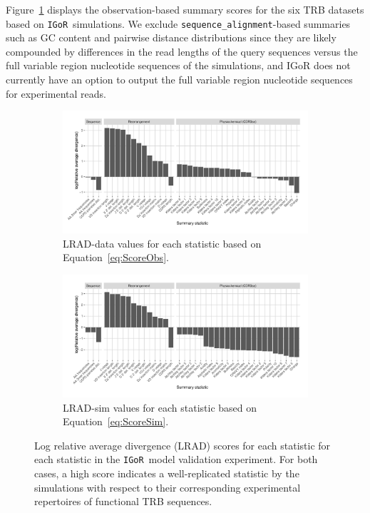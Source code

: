 \documentclass{article}
\newcommand{\igor}{\texttt{IGoR}}
\begin{document}
Figure~\ref{fig:ObsScoresTCR} displays the observation-based summary scores for the six TRB datasets based on \igor\ simulations.
We exclude \texttt{sequence\_alignment}-based summaries such as GC content and pairwise distance distributions since they are likely compounded by differences in the read lengths of the query sequences versus the full variable region nucleotide sequences of the simulations, and IGoR does not currently have an option to output the full variable region nucleotide sequences for experimental reads.
\begin{figure}
	\begin{subfigure}{\textwidth}
    	\includegraphics[width=\linewidth]{Figures/IgorScores/obs_score_plot.pdf}
    	\caption{LRAD-data values for each statistic based on Equation~\ref{eq:ScoreObs}.
        }
    	\label{fig:ObsScoresTCR}
	\end{subfigure}
	\begin{subfigure}{\textwidth}
    	\includegraphics[width=\linewidth]{Figures/IgorScores/sim_score_plot.pdf}
    	\caption{LRAD-sim values for each statistic based on Equation~\ref{eq:ScoreSim}.
    	}
    	\label{fig:SimScoresTCR}
	\end{subfigure}
	\caption{Log relative average divergence (LRAD) scores for each statistic for each statistic in the \igor\ model validation experiment. For both cases, a high score indicates a well-replicated statistic by the simulations with respect to their corresponding experimental repertoires of functional TRB sequences.}
\end{figure}
\end{document}
